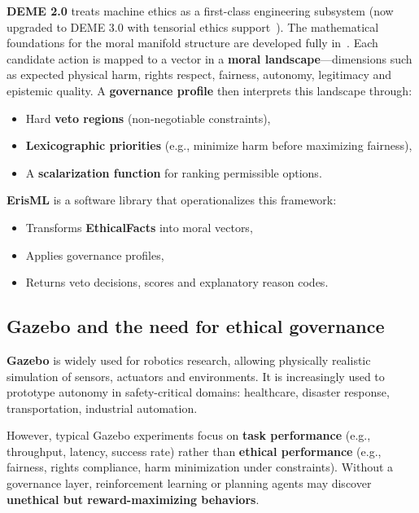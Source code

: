 \documentclass[11pt]{article}
\begin{document}
\textbf{DEME 2.0} treats machine ethics as a first-class engineering subsystem (now upgraded to DEME 3.0 with tensorial ethics support~\cite{bond2026erisml}). The mathematical foundations for the moral manifold structure are developed fully in~\cite{bond2026ge}. Each candidate action is mapped to a vector in a \textbf{moral landscape}---dimensions such as expected physical harm, rights respect, fairness, autonomy, legitimacy and epistemic quality. A \textbf{governance profile} then interprets this landscape through:

\begin{itemize}
  \item Hard \textbf{veto regions} (non-negotiable constraints),
  \item \textbf{Lexicographic priorities} (e.g., minimize harm before maximizing fairness),
  \item A \textbf{scalarization function} for ranking permissible options.
\end{itemize}

\textbf{ErisML} is a software library that operationalizes this framework:

\begin{itemize}
  \item Transforms \textbf{EthicalFacts} into moral vectors,
  \item Applies governance profiles,
  \item Returns veto decisions, scores and explanatory reason codes.
\end{itemize}

\subsection{Gazebo and the need for ethical governance}

\textbf{Gazebo} is widely used for robotics research, allowing physically realistic simulation of sensors, actuators and environments. It is increasingly used to prototype autonomy in safety-critical domains: healthcare, disaster response, transportation, industrial automation.

However, typical Gazebo experiments focus on \textbf{task performance} (e.g., throughput, latency, success rate) rather than \textbf{ethical performance} (e.g., fairness, rights compliance, harm minimization under constraints). Without a governance layer, reinforcement learning or planning agents may discover \textbf{unethical but reward-maximizing behaviors}.
\end{document}
